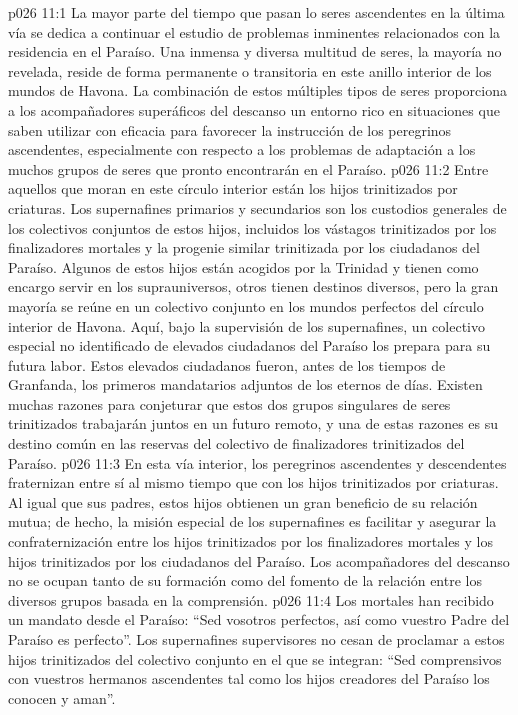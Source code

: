 \vs p026 11:1 La mayor parte del tiempo que pasan lo seres ascendentes en la última vía se dedica a continuar el estudio de problemas inminentes relacionados con la residencia en el Paraíso. Una inmensa y diversa multitud de seres, la mayoría no revelada, reside de forma permanente o transitoria en este anillo interior de los mundos de Havona. La combinación de estos múltiples tipos de seres proporciona a los acompañadores superáficos del descanso un entorno rico en situaciones que saben utilizar con eficacia para favorecer la instrucción de los peregrinos ascendentes, especialmente con respecto a los problemas de adaptación a los muchos grupos de seres que pronto encontrarán en el Paraíso.
\vs p026 11:2 \pc Entre aquellos que moran en este círculo interior están los hijos trinitizados por criaturas. Los supernafines primarios y secundarios son los custodios generales de los colectivos conjuntos de estos hijos, incluidos los vástagos trinitizados por los finalizadores mortales y la progenie similar trinitizada por los ciudadanos del Paraíso. Algunos de estos hijos están acogidos por la Trinidad y tienen como encargo servir en los suprauniversos, otros tienen destinos diversos, pero la gran mayoría se reúne en un colectivo conjunto en los mundos perfectos del círculo interior de Havona. Aquí, bajo la supervisión de los supernafines, un colectivo especial no identificado de elevados ciudadanos del Paraíso los prepara para su futura labor. Estos elevados ciudadanos fueron, antes de los tiempos de Granfanda, los primeros mandatarios adjuntos de los eternos de días. Existen muchas razones para conjeturar que estos dos grupos singulares de seres trinitizados trabajarán juntos en un futuro remoto, y una de estas razones es su destino común en las reservas del colectivo de finalizadores trinitizados del Paraíso.
\vs p026 11:3 En esta vía interior, los peregrinos ascendentes y descendentes fraternizan entre sí al mismo tiempo que con los hijos trinitizados por criaturas. Al igual que sus padres, estos hijos obtienen un gran beneficio de su relación mutua; de hecho, la misión especial de los supernafines es facilitar y asegurar la confraternización entre los hijos trinitizados por los finalizadores mortales y los hijos trinitizados por los ciudadanos del Paraíso. Los acompañadores del descanso no se ocupan tanto de su formación como del fomento de la relación entre los diversos grupos basada en la comprensión.
\vs p026 11:4 Los mortales han recibido un mandato desde el Paraíso: “Sed vosotros perfectos, así como vuestro Padre del Paraíso es perfecto”. Los supernafines supervisores no cesan de proclamar a estos hijos trinitizados del colectivo conjunto en el que se integran: “Sed comprensivos con vuestros hermanos ascendentes tal como los hijos creadores del Paraíso los conocen y aman”.
